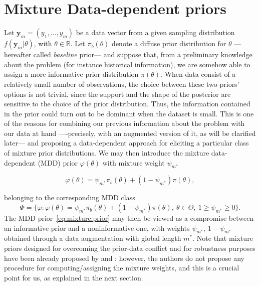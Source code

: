 \documentclass{statsoc}
\begin{document}
\section{Mixture Data-dependent priors}
\label{sec:mixture}

Let $ \bm{y}_{m}= (y_{1},...,y_{m})$ be a data vector from a given sampling distribution $f(\bm{y}_{m}|\theta)$, with $\theta \in 
\mathbb{R}$. Let $\pi_{b}(\theta) $ denote a diffuse prior 
distribution for $\theta$ ---hereafter called \textit{baseline} prior--- and suppose that, from a preliminary knowledge about the problem (for instance historical information), we are somehow able to assign 
a more informative prior distribution $\pi(\theta)$. 
When data consist of a relatively small number of observations, the choice between these two priors' options is 
not trivial, since the support and the shape of the posterior are sensitive to the choice of the prior distribution. 
Thus, the information contained in the prior could turn out to be dominant when the dataset is small. This is one of the reasons for combining our previous information about the problem with our data at hand ----precisely, with an augmented version of it, as will be clarified later--- and proposing a data-dependent approach for eliciting a particular class of mixture prior distributions. We may then introduce the mixture data-dependent (MDD) prior $\varphi(\theta)$ with mixture weight $\psi_{m^{*}}$

\begin{equation}
\varphi(\theta)= \psi_{m^{*}}\pi_{b}(\theta)+(1-\psi_{m^{*}})\pi(\theta),
\label{eq:mixture:prior}
\end{equation}

belonging to the corresponding MDD class $$\Phi= \{ \varphi : \varphi(\theta)= \psi_{m^{*}}\pi_{b}(\theta)+(1-\psi_{m^{*}})\pi(\theta) ,\ \theta \in \Theta,\ 1 \ge\psi_{m^{*}}\ge 0 \}.$$ The MDD prior~\eqref{eq:mixture:prior} may then be viewed as a compromise between an informative prior and a noninformative one, with weights $\psi_{m^{*}}, \ 1-\psi_{m^{*}}$ obtained through a data augmentation with global length $m^{*}$. Note that mixture priors designed for overcoming the prior-data conflict and for robustness purposes have been already proposed by \cite{mutsvari2016addressing} and \cite{schmidli2014robust}: however, the authors do not propose any procedure for computing/assigning the mixture weights, and this is a crucial point for us, as explained in the next section. 
\end{document}
